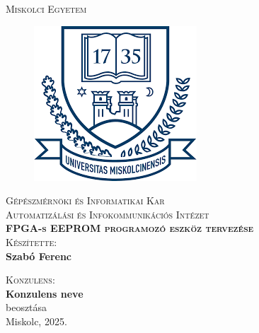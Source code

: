 \documentclass[a4paper,12pt,oneside]{book}
\newcommand{\nev}{Szabó Ferenc}
\newcommand{\cim}{FPGA-s EEPROM programozó eszköz tervezése}
\begin{document}
\thispagestyle{empty}

\begin{center}
		\textsc{\Large{Miskolci Egyetem}}
	
	\begin{figure}[H]
		\centering
		\includegraphics[scale=0.5]{misk_egy.png}
	\end{figure}
	
	\textsc{\Large{Gépészmérnöki és Informatikai Kar}}\\	
	\vspace{5mm}	
	\textsc{\Large{Automatizálási és Infokommunikációs Intézet}}\\
	
	\vspace{14mm}	
	\textsc{\Large{\textbf{\cim}}}\\
	
	\vspace{10mm}
	\textsc{Készítette:}\\
	\textbf{\nev}\\
	\vspace{20mm}
	
	\vspace{5mm}
	\textsc{Konzulens:}\\
	\textbf{Konzulens neve}\\
	beosztása\\
	
	\vspace{35mm} Miskolc, 2025.	
	
\end{center}
\thispagestyle{empty}
\end{document}
